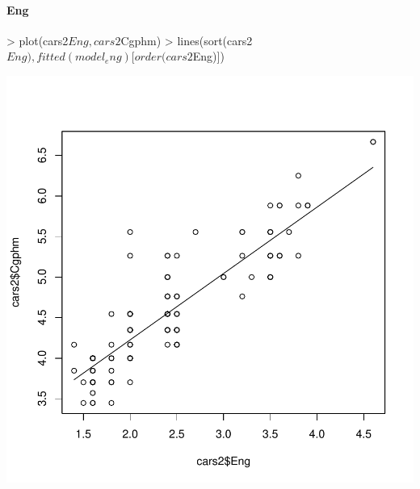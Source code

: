 \documentclass{article}
\begin{document}
\paragraph*{Eng}
\begin{Schunk}
\begin{Sinput}
> plot(cars2$Eng, cars2$Cgphm)
> lines(sort(cars2$Eng), fitted(model_eng)[order (cars2$Eng)])
\end{Sinput}
\end{Schunk}
\includegraphics{Assignment1b-009}
\end{document}

